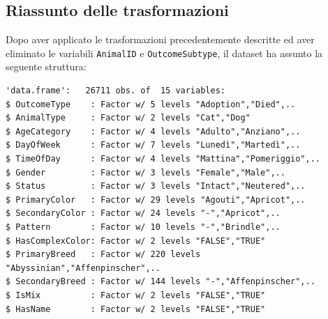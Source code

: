 \subsection{Riassunto delle trasformazioni}

Dopo aver applicato le trasformazioni precedentemente descritte ed aver eliminato le variabili \texttt{AnimalID} e \texttt{OutcomeSubtype}, il dataset ha assunto la seguente struttura:

\begin{verbatim}
'data.frame':	26711 obs. of  15 variables:
$ OutcomeType    : Factor w/ 5 levels "Adoption","Died",..
$ AnimalType     : Factor w/ 2 levels "Cat","Dog"
$ AgeCategory    : Factor w/ 4 levels "Adulto","Anziano",..
$ DayOfWeek      : Factor w/ 7 levels "Lunedì","Martedì",..
$ TimeOfDay      : Factor w/ 4 levels "Mattina","Pomeriggio",..
$ Gender         : Factor w/ 3 levels "Female","Male",..
$ Status         : Factor w/ 3 levels "Intact","Neutered",..
$ PrimaryColor   : Factor w/ 29 levels "Agouti","Apricot",..
$ SecondaryColor : Factor w/ 24 levels "-","Apricot",..
$ Pattern        : Factor w/ 10 levels "-","Brindle",..
$ HasComplexColor: Factor w/ 2 levels "FALSE","TRUE"
$ PrimaryBreed   : Factor w/ 220 levels "Abyssinian","Affenpinscher",..
$ SecondaryBreed : Factor w/ 144 levels "-","Affenpinscher",..
$ IsMix          : Factor w/ 2 levels "FALSE","TRUE"
$ HasName        : Factor w/ 2 levels "FALSE","TRUE"
\end{verbatim}